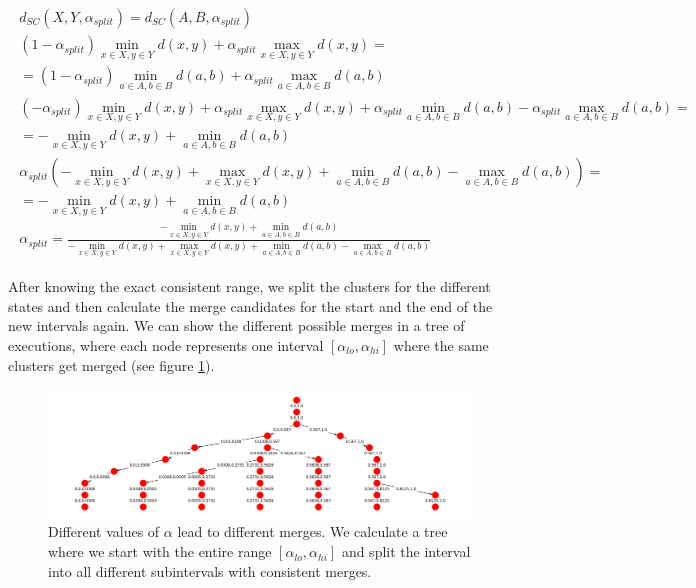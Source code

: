 \begin{equation}
    \begin{aligned}
        \begin{gathered}
        d_{SC}(X,Y,\alpha_{split}) = d_{SC}(A,B,\alpha_{split})\\
        (1 - \alpha_{split}) \min\limits_{x \in X, y \in Y} d(x,y) + \alpha_{split} \max\limits_{x \in X, y \in Y} d(x,y) = \\
        = (1 - \alpha_{split}) \min\limits_{a \in A, b \in B} d(a,b) + \alpha_{split} \max\limits_{a \in A, b \in B} d(a,b)\\
        (- \alpha_{split}) \min\limits_{x \in X, y \in Y} d(x,y) + \alpha_{split} \max\limits_{x \in X, y \in Y} d(x,y) + \alpha_{split} \min\limits_{a \in A, b \in B} d(a,b) - \alpha_{split} \max\limits_{a \in A, b \in B} d(a,b) =\\
        = - \min\limits_{x \in X, y \in Y} d(x,y) + \min\limits_{a \in A, b \in B} d(a,b)\\
        \alpha_{split} (- \min\limits_{x \in X, y \in Y} d(x,y) + \max\limits_{x \in X, y \in Y} d(x,y) + \min\limits_{a \in A, b \in B} d(a,b) - \max\limits_{a \in A, b \in B} d(a,b)) =\\
        = - \min\limits_{x \in X, y \in Y} d(x,y) + \min\limits_{a \in A, b \in B} d(a,b)\\
        \alpha_{split} = \frac{- \min\limits_{x \in X, y \in Y} d(x,y) + \min\limits_{a \in A, b \in B} d(a,b)}{- \min\limits_{x \in X, y \in Y} d(x,y) + \max\limits_{x \in X, y \in Y} d(x,y) + \min\limits_{a \in A, b \in B} d(a,b) - \max\limits_{a \in A, b \in B} d(a,b)}
    \end{gathered}
    \end{aligned}
    \label{eq:equalizesc}
\end{equation}

After knowing the exact consistent range, we split the clusters for the different states and then calculate the merge candidates for the start and the end of the new intervals again. We can show the different possible merges in a tree of executions, where each node represents one interval $[\alpha_{lo}, \alpha_{hi}]$ where the same clusters get merged (see figure \ref{fig:toe}).

\begin{figure}[h]
    \centering
    \includegraphics[width=\textwidth]{images/res_tree}
    \caption{Different values of $\alpha$ lead to different merges. We calculate a tree where we start with the entire range $[\alpha_{lo}, \alpha_{hi}]$ and split the interval into all different subintervals with consistent merges.}
    \label{fig:toe}
\end{figure}

